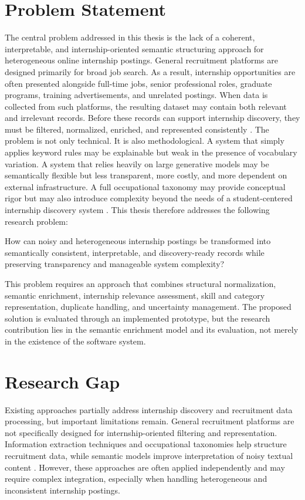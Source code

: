 \section{Problem Statement}
The central problem addressed in this thesis is the lack of a coherent, interpretable, and
internship-oriented semantic structuring approach for heterogeneous online internship postings.
General recruitment platforms are designed primarily for broad job search. As a result, internship
opportunities are often presented alongside full-time jobs, senior professional roles, graduate
programs, training advertisements, and unrelated postings. When data is collected from such
platforms, the resulting dataset may contain both relevant and irrelevant records. Before these
records can support internship discovery, they must be filtered, normalized, enriched, and
represented consistently \cite{batini2009methodologies, christen2012data}.
The problem is not only technical. It is also methodological. A system that simply applies
keyword rules may be explainable but weak in the presence of vocabulary variation. A system
that relies heavily on large generative models may be semantically flexible but less transparent,
more costly, and more dependent on external infrastructure. A full occupational taxonomy may
provide conceptual rigor but may also introduce complexity beyond the needs of a student-centered internship discovery system
\cite{manning2008introduction, staab2009handbook, schwartz2020green}.
This thesis therefore addresses the following research problem:

How can noisy and heterogeneous internship postings be transformed into semantically
consistent, interpretable, and discovery-ready records while preserving transparency and
manageable system complexity?

This problem requires an approach that combines structural normalization, semantic enrichment,
internship relevance assessment, skill and category representation, duplicate handling, and
uncertainty management. The proposed solution is evaluated through an implemented prototype,
but the research contribution lies in the semantic enrichment model and its evaluation, not
merely in the existence of the software system.


\section{Research Gap}
Existing approaches partially address internship discovery and recruitment data processing, but important limitations remain. General recruitment platforms are not specifically designed for internship-oriented filtering and representation. Information extraction techniques and occupational taxonomies help structure recruitment data, while semantic models improve interpretation of noisy textual content \cite{li2020survey, peterson2001occupational, luan2021sparse}. However, these approaches are often applied independently and may require complex integration, especially when handling heterogeneous and inconsistent internship postings.


